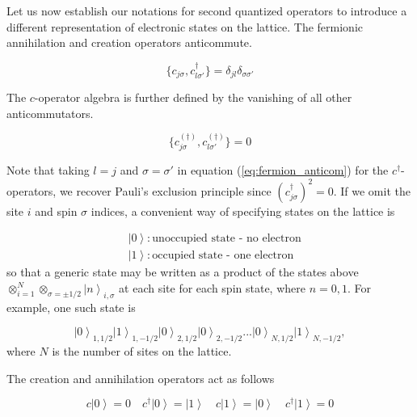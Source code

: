 Let us now establish our notations for second quantized operators to introduce a different representation of electronic states on the lattice. The fermionic annihilation and creation operators anticommute.

\begin{equation}
\{ c_{j\sigma} , c_{l \sigma'}^\dagger \} = \delta_{jl} \delta_{\sigma\sigma'}
\end{equation}

The $c$-operator algebra is further defined by the vanishing of all other anticommutators.

\begin{equation}\label{eq:fermion_anticom}
\{ c_{j\sigma}^{(\dagger)} , c_{l \sigma'}^{(\dagger)} \} = 0
\end{equation}

Note that taking $l = j$ and $\sigma = \sigma'$ in equation (\ref{eq:fermion_anticom}) for the $c^\dagger$-operators, we recover Pauli's exclusion principle since $(c_{j\sigma}^\dagger)^2 = 0$. If we omit the site $i$ and spin $\sigma$ indices, a convenient way of specifying states on the lattice is

\begin{equation}
\begin{split}
&\left| 0 \right\rangle : \text{unoccupied state - no electron} \\
&\left| 1 \right\rangle : \text{occupied state - one electron}
\end{split}
\end{equation}
so that a generic state may be written as a product of the states above $\otimes_{i=1}^{N} \otimes_{\sigma = \pm 1/2} \left| n \right\rangle_{i, \sigma}$ at each site for each spin state, where $n= 0, 1$. For example, one such state is

\begin{equation}
\left| 0 \right\rangle_{1, 1/2} \left| 1 \right\rangle_{1, -1/2} \left| 0 \right\rangle_{2, 1/2} \left| 0 \right\rangle_{2, -1/2} ... \left| 0 \right\rangle_{N, 1/2} \left| 1 \right\rangle_{N, -1/2}  ,
\end{equation}
where $N$ is the number of sites on the lattice.

The creation and annihilation operators act as follows

\begin{equation}
c \left| 0 \right\rangle = 0 \quad c^\dagger \left| 0 \right\rangle = \left| 1 \right\rangle \quad c \left| 1 \right\rangle = \left| 0 \right\rangle \quad c^\dagger \left| 1 \right\rangle = 0
\end{equation}


